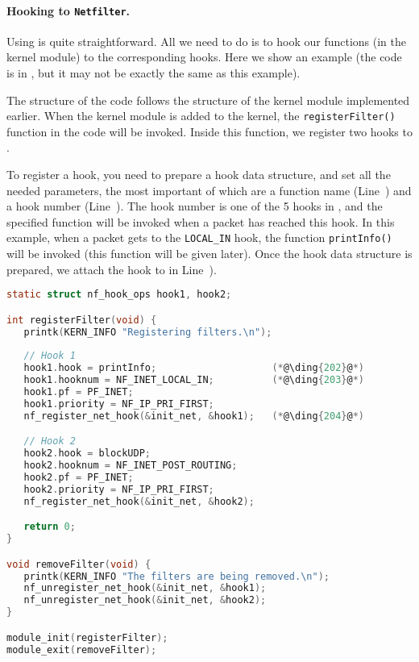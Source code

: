 \paragraph{Hooking to \texttt{Netfilter}.} 
Using \netfilter is quite straightforward. All we need to do
is to hook our functions (in the kernel module) to the corresponding
\netfilter hooks. Here we show an example (the code is in
, but it may not be exactly the same as 
this example).

The structure of the code follows the structure of the kernel module 
implemented earlier. When the kernel module is added to the 
kernel, the \texttt{registerFilter()} function in the code will be 
invoked. Inside this function, we register two hooks 
to \netfilter. 

To register a hook, you need to prepare a hook data structure, 
and set all the needed parameters, the most important of which
are a function name (Line~) and a hook number (Line~). 
The hook number is one of the 
5 hooks in \netfilter, and the specified function will be 
invoked when a packet has reached this hook. In this example,
when a packet gets to the \texttt{LOCAL\_IN} hook,  the 
function \texttt{printInfo()} will be invoked (this function
will be given later). Once the hook data structure is prepared,
we attach the hook to \netfilter in Line~).


\begin{lstlisting}[language=C, caption={Register hook functions to \netfilter}]
static struct nf_hook_ops hook1, hook2;

int registerFilter(void) {
   printk(KERN_INFO "Registering filters.\n");
   
   // Hook 1
   hook1.hook = printInfo;                    (*@\ding{202}@*)
   hook1.hooknum = NF_INET_LOCAL_IN;          (*@\ding{203}@*)
   hook1.pf = PF_INET;
   hook1.priority = NF_IP_PRI_FIRST;
   nf_register_net_hook(&init_net, &hook1);   (*@\ding{204}@*)

   // Hook 2
   hook2.hook = blockUDP;
   hook2.hooknum = NF_INET_POST_ROUTING;
   hook2.pf = PF_INET;
   hook2.priority = NF_IP_PRI_FIRST;
   nf_register_net_hook(&init_net, &hook2);

   return 0;
}

void removeFilter(void) {
   printk(KERN_INFO "The filters are being removed.\n");
   nf_unregister_net_hook(&init_net, &hook1);
   nf_unregister_net_hook(&init_net, &hook2);
}

module_init(registerFilter);
module_exit(removeFilter);
\end{lstlisting}

